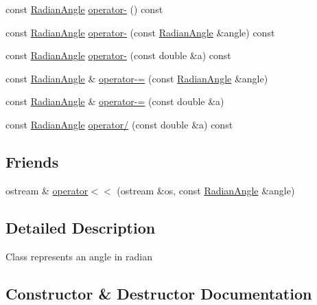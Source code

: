 \begin{DoxyCompactItemize}
const \hyperlink{class_radian_angle}{Radian\+Angle} \hyperlink{class_radian_angle_ae95e5e7dce81b620f51b90173f91e0b3}{operator-\/} () const
\item 
const \hyperlink{class_radian_angle}{Radian\+Angle} \hyperlink{class_radian_angle_a742ebbb27af0fff0daeff658d0b9af9f}{operator-\/} (const \hyperlink{class_radian_angle}{Radian\+Angle} \&angle) const
\item 
const \hyperlink{class_radian_angle}{Radian\+Angle} \hyperlink{class_radian_angle_aca764c1e2df081fbbcbd1dce23934fae}{operator-\/} (const double \&a) const
\item 
const \hyperlink{class_radian_angle}{Radian\+Angle} \& \hyperlink{class_radian_angle_adde4dd5627874db7748711fc4e587706}{operator-\/=} (const \hyperlink{class_radian_angle}{Radian\+Angle} \&angle)
\item 
const \hyperlink{class_radian_angle}{Radian\+Angle} \& \hyperlink{class_radian_angle_a2bfd60cced12284db32b4a594b5da2aa}{operator-\/=} (const double \&a)
\item 
const \hyperlink{class_radian_angle}{Radian\+Angle} \hyperlink{class_radian_angle_a60cf94ad19c21efe288f9a73e0dd158e}{operator/} (const double \&a) const
\end{DoxyCompactItemize}
\subsection*{Friends}
\begin{DoxyCompactItemize}
\item 
ostream \& \hyperlink{class_radian_angle_a19bc64edfd90b3e701d4e9fc173162e1}{operator$<$$<$} (ostream \&os, const \hyperlink{class_radian_angle}{Radian\+Angle} \&angle)
\end{DoxyCompactItemize}


\subsection{Detailed Description}
Class represents an angle in radian 

\subsection{Constructor \& Destructor Documentation}
\hypertarget{class_radian_angle_afbe1e0f9fa6ac4d7ca513c6d7a7cafab}{}\label{class_radian_angle_afbe1e0f9fa6ac4d7ca513c6d7a7cafab} 
